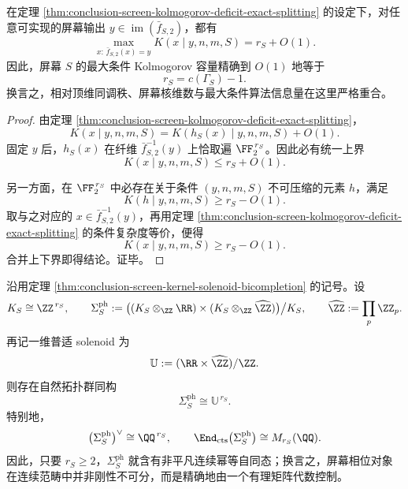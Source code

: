 \begin{corollary}[部分屏幕的最大条件复杂度恰等于其屏幕秩]\label{cor:conclusion-screen-max-conditional-complexity-equals-rank}
在定理 \ref{thm:conclusion-screen-kolmogorov-deficit-exact-splitting} 的设定下，对任意可实现的屏幕输出 \(y\in \operatorname{im}(\bar f_{S,2})\)，都有
\[
\max_{x:\,\bar f_{S,2}(x)=y} K(x\mid y,n,m,S)=r_S+O(1).
\]
因此，屏幕 \(S\) 的最大条件 Kolmogorov 容量精确到 \(O(1)\) 地等于
\[
r_S=c(\Gamma_S)-1.
\]
换言之，相对顶维同调秩、屏幕核维数与最大条件算法信息量在这里严格重合。
\end{corollary}

\begin{proof}
由定理 \ref{thm:conclusion-screen-kolmogorov-deficit-exact-splitting}，
\[
K(x\mid y,n,m,S)=K(h_S(x)\mid y,n,m,S)+O(1).
\]
固定 \(y\) 后，\(h_S(x)\) 在纤维 \(\bar f_{S,2}^{-1}(y)\) 上恰取遍 \(\FF_2^{\,r_S}\)。因此必有统一上界
\[
K(x\mid y,n,m,S)\le r_S+O(1).
\]

另一方面，在 \(\FF_2^{\,r_S}\) 中必存在关于条件 \((y,n,m,S)\) 不可压缩的元素 \(h\)，满足
\[
K(h\mid y,n,m,S)\ge r_S-O(1).
\]
取与之对应的 \(x\in \bar f_{S,2}^{-1}(y)\)，再用定理 \ref{thm:conclusion-screen-kolmogorov-deficit-exact-splitting} 的条件复杂度等价，便得
\[
K(x\mid y,n,m,S)\ge r_S-O(1).
\]
合并上下界即得结论。证毕。
\end{proof}

\begin{theorem}\label{thm:conclusion-screen-phase-object-universal-solenoid-rational-endomorphisms}
沿用定理 \ref{thm:conclusion-screen-kernel-solenoid-bicompletion} 的记号。设
\[
K_S\cong \ZZ^{\,r_S},
\qquad
\Sigma_S^{\mathrm{ph}}
:=
\bigl((K_S\otimes_{\ZZ}\RR)\times (K_S\otimes_{\ZZ}\widehat{\ZZ})\bigr)\big/K_S,
\qquad
\widehat{\ZZ}:=\prod_p\ZZ_p.
\]
再记一维普适 solenoid 为
\[
\mathbb U:= (\RR\times \widehat{\ZZ})/\ZZ.
\]
则存在自然拓扑群同构
\[
\Sigma_S^{\mathrm{ph}}\cong \mathbb U^{\,r_S}.
\]
特别地，
\[
\bigl(\Sigma_S^{\mathrm{ph}}\bigr)^\vee \cong \QQ^{\,r_S},
\qquad
\End_{\mathrm{cts}}\bigl(\Sigma_S^{\mathrm{ph}}\bigr)
\cong
M_{r_S}(\QQ).
\]
因此，只要 \(r_S\ge 2\)，\(\Sigma_S^{\mathrm{ph}}\) 就含有非平凡连续幂等自同态；换言之，屏幕相位对象在连续范畴中并非刚性不可分，而是精确地由一个有理矩阵代数控制。
\end{theorem}

